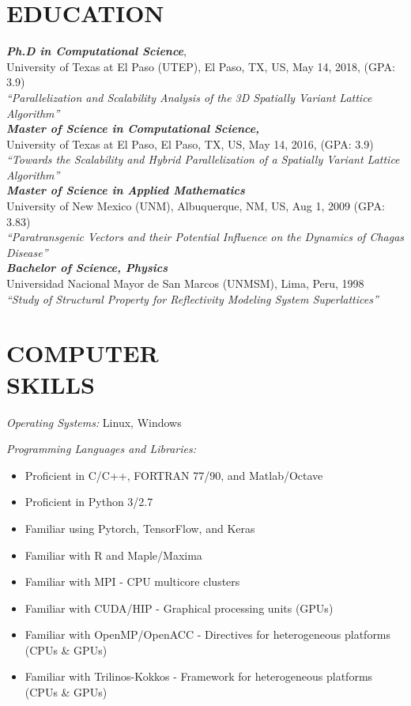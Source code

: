 \documentclass[margin]{res}
\begin{document}
\begin{resume}
\section{EDUCATION} %
{\sl \bf Ph.D in Computational Science}, \\
University of Texas at El Paso (UTEP), El Paso, TX, US, May 14, 2018, (GPA: 3.9) \\ 
\textit{``Parallelization and Scalability Analysis of the 3D Spatially Variant Lattice Algorithm''}\\
%
{\sl \bf Master of Science in Computational Science,} \\
University of Texas at El Paso, El Paso, TX, US, May 14, 2016, (GPA: 3.9) \\
\textit{``Towards the Scalability and Hybrid Parallelization of a Spatially Variant Lattice Algorithm''}\\
%
{\sl \bf Master of Science in Applied Mathematics}\\
University of New Mexico (UNM), Albuquerque, NM, US, Aug 1, 2009 (GPA: 3.83) \\
\textit{``Paratransgenic Vectors and their Potential Influence on the Dynamics of Chagas Disease''} \\    
%
{\sl\bf Bachelor of Science, Physics}\\
Universidad Nacional Mayor de San Marcos (UNMSM), Lima, Peru, 1998\\
\textit{``Study of Structural Property for Reflectivity Modeling System Superlattices''}   
                 
\section{COMPUTER \\ SKILLS}
{\sl Operating Systems:} Linux, Windows%

{\sl Programming Languages and Libraries:} %
  \begin{itemize}  \itemsep -1pt 
      \item Proficient in C/C++,  FORTRAN 77/90, and Matlab/Octave 
      \item Proficient in Python 3/2.7
      \item Familiar using Pytorch, TensorFlow, and Keras 
      \item Familiar with R and Maple/Maxima
      \item Familiar with MPI - CPU multicore clusters
      \item Familiar with CUDA/HIP - Graphical processing units (GPUs)
      \item Familiar with OpenMP/OpenACC -  Directives for heterogeneous platforms (CPUs \& GPUs) 
      \item Familiar with Trilinos-Kokkos - Framework for heterogeneous platforms (CPUs \& GPUs)     
    \end{itemize}


\end{resume}
\end{document}
